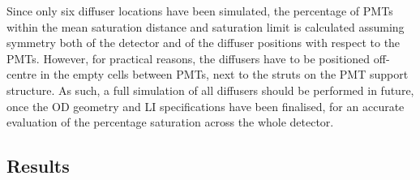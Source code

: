 \documentclass[a4paper,11pt]{article}
\begin{document}
Since only six diffuser locations have been simulated, the percentage of PMTs within the mean saturation distance and saturation limit is calculated assuming symmetry both of the detector and of the diffuser positions with respect to the PMTs. However, for practical reasons, the diffusers have to be positioned off-centre in the empty cells between PMTs, next to the struts on the PMT support structure. As such, a full simulation of all diffusers should be performed in future, once the OD geometry and LI specifications have been finalised, for an accurate evaluation of the percentage saturation across the whole detector.

\subsection{Results}\label{subsec:satResults}
\end{document}
